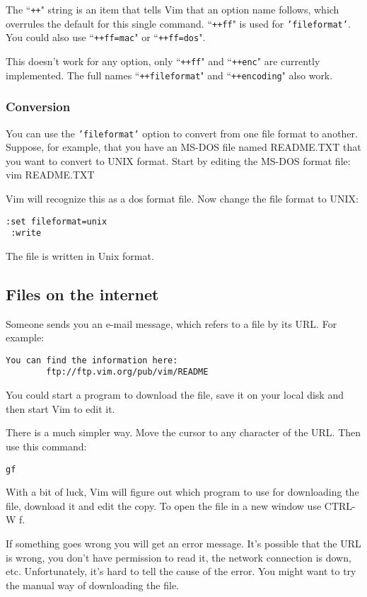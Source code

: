 The ``\texttt{++}" string is an item that tells Vim that an option name follows, which overrules the default for this single command.
``\texttt{++ff}" is used for \texttt{'fileformat'}.
You could also use ``\texttt{++ff=mac}" or ``\texttt{++ff=dos}".

This doesn't work for any option, only ``\texttt{++ff}" and ``\texttt{++enc}" are currently implemented.
The full names ``\texttt{++fileformat}" and ``\texttt{++encoding}" also work.
\subsubsection{Conversion}
You can use the \texttt{'fileformat'} option to convert from one file format to another.
Suppose, for example, that you have an MS-DOS file named README.TXT that you want to convert to UNIX format.
Start by editing the MS-DOS format file: vim README.TXT

Vim will recognize this as a dos format file.
Now change the file format to UNIX:

\begin{Verbatim}[samepage=true]
 :set fileformat=unix
 :write
\end{Verbatim}

The file is written in Unix format.
\subsection{Files on the internet}
Someone sends you an e-mail message, which refers to a file by its URL.
For example:

\begin{Verbatim}[samepage=true]
    You can find the information here: 
        ftp://ftp.vim.org/pub/vim/README 
\end{Verbatim}

You could start a program to download the file, save it on your local disk and then start Vim to edit it.

There is a much simpler way.
Move the cursor to any character of the URL.
Then use this command:

\begin{Verbatim}[samepage=true]
 gf
\end{Verbatim}

With a bit of luck, Vim will figure out which program to use for downloading the file, download it and edit the copy.
To open the file in a new window use CTRL-W f.

If something goes wrong you will get an error message.
It's possible that the URL is wrong, you don't have permission to read it, the network connection is down, etc.
Unfortunately, it's hard to tell the cause of the error.
You might want to try the manual way of downloading the file.

